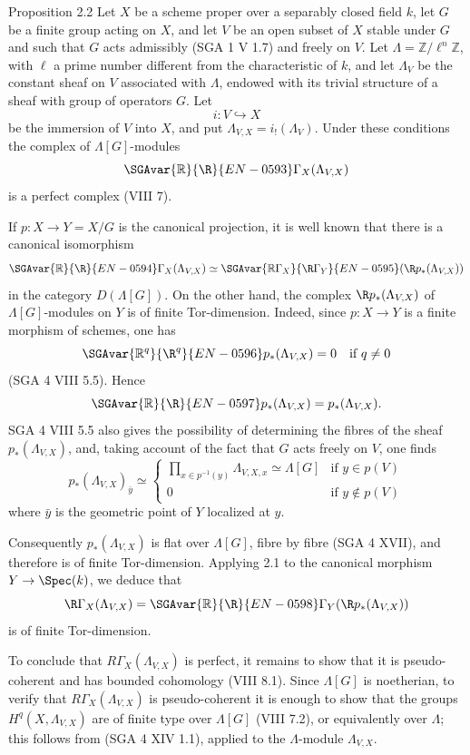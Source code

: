 \begin{statement}{Proposition 2.2}
Let $X$ be a scheme proper over a separably closed field $k$, let $G$ be a finite group acting on $X$, and let $V$ be an open subset of $X$ stable under $G$ and such that $G$ acts admissibly (SGA 1 V 1.7) and freely on $V$. Let $\Lambda=\mathbb Z/\ell^n\mathbb Z$, with $\ell$ a prime number different from the characteristic of $k$, and let $\Lambda_V$ be the constant sheaf on $V$ associated with $\Lambda$, endowed with its trivial structure of a sheaf with group of operators $G$. Let
\[
i:V\hookrightarrow X
\]
be the immersion of $V$ into $X$, and put $\Lambda_{V,X}=i_!(\Lambda_V)$. Under these conditions the complex of $\Lambda[G]$-modules
\[
\SGAvar{\mathbb{R}}{\R}{EN-0593}\Gamma_X(\Lambda_{V,X})
\]
is a perfect complex (VIII 7).
\end{statement}

\begin{prooftext}
If $p:X\to Y=X/G$ is the canonical projection, it is well known that there is a canonical isomorphism
\[
\SGAvar{\mathbb{R}}{\R}{EN-0594}\Gamma_X(\Lambda_{V,X})\simeq \SGAvar{\mathbb{R}\Gamma_X}{\R\Gamma_Y}{EN-0595}(\R p_*(\Lambda_{V,X}))
\]
in the category $D(\Lambda[G])$. On the other hand, the complex $\R p_*(\Lambda_{V,X})$ of $\Lambda[G]$-modules on $Y$ is of finite Tor-dimension. Indeed, since $p:X\to Y$ is a finite morphism of schemes, one has
\[
\SGAvar{\mathbb{R}^q}{\R^q}{EN-0596} p_*(\Lambda_{V,X})=0\quad\text{if }q\ne0
\]
(SGA 4 VIII 5.5). Hence
\[
\SGAvar{\mathbb{R}}{\R}{EN-0597} p_*(\Lambda_{V,X})=p_*(\Lambda_{V,X}).
\]
SGA 4 VIII 5.5 also gives the possibility of determining the fibres of the sheaf $p_*(\Lambda_{V,X})$, and, taking account of the fact that $G$ acts freely on $V$, one finds
\[
p_*(\Lambda_{V,X})_{\bar y}\simeq
\begin{cases}
\displaystyle \prod_{x\in p^{-1}(y)}\Lambda_{V,X,x}\simeq \Lambda[G]& \text{if } y\in p(V)\\[1em]
0& \text{if } y\notin p(V)
\end{cases}
\]
where $\bar y$ is the geometric point of $Y$ localized at $y$.

Consequently $p_*(\Lambda_{V,X})$ is flat over $\Lambda[G]$, fibre by fibre (SGA 4 XVII), and therefore is of finite Tor-dimension. Applying 2.1 to the canonical morphism $Y\to\Spec(k)$, we deduce that
\[
\R\Gamma_X(\Lambda_{V,X})=\SGAvar{\mathbb{R}}{\R}{EN-0598}\Gamma_Y(\R p_*(\Lambda_{V,X}))
\]
is of finite Tor-dimension.

To conclude that $R\Gamma_X(\Lambda_{V,X})$ is perfect, it remains to show that it is pseudo-coherent and has bounded cohomology (VIII 8.1). Since $\Lambda[G]$ is noetherian, to verify that $R\Gamma_X(\Lambda_{V,X})$ is pseudo-coherent it is enough to show that the groups $H^q(X,\Lambda_{V,X})$ are of finite type over $\Lambda[G]$ (VIII 7.2), or equivalently over $\Lambda$; this follows from (SGA 4 XIV 1.1), applied to the $\Lambda$-module $\Lambda_{V,X}$.
\end{prooftext}

